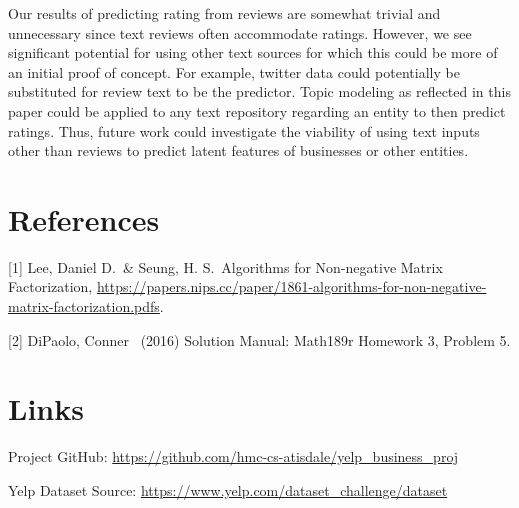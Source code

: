 \documentclass{article}
\begin{document}
Our results of predicting rating from reviews are somewhat trivial and unnecessary since text reviews often accommodate ratings.  However, we see significant potential for using other text sources for which this could be more of an initial proof of concept.  For example, twitter data could potentially be substituted for review text to be the predictor.  Topic modeling as reflected in this paper could be applied to any text repository regarding an entity to then predict ratings.  Thus, future work could investigate the viability of using text inputs other than reviews to predict latent features of businesses or other entities.  

\section*{References}

[1] Lee, Daniel D.\ \& Seung, H. S.\ Algorithms for Non-negative Matrix Factorization, \url{https://papers.nips.cc/paper/1861-algorithms-for-non-negative-matrix-factorization.pdfs}.

[2] DiPaolo, Conner \  (2016) Solution Manual: Math189r Homework 3, Problem 5.

\section*{Links}

Project GitHub: \url{https://github.com/hmc-cs-atisdale/yelp_business_proj}

Yelp Dataset Source: \url{https://www.yelp.com/dataset_challenge/dataset}
\end{document}
